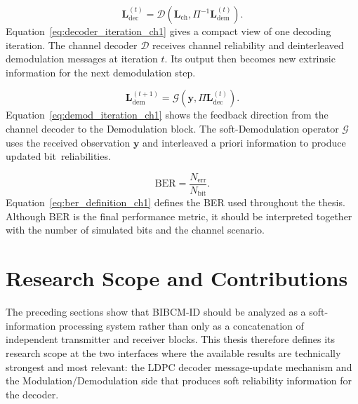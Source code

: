 \begin{equation}
\label{eq:decoder_iteration_ch1}
\mathbf{L}^{(t)}_{\mathrm{dec}}=
\mathcal{D}\!\left(\mathbf{L}_{\mathrm{ch}},\Pi^{-1}\mathbf{L}^{(t)}_{\mathrm{dem}}\right).
\end{equation}
Equation~\eqref{eq:decoder_iteration_ch1} gives a compact view of one decoding iteration. The channel decoder $\mathcal{D}$ receives channel reliability and deinterleaved demodulation messages at iteration $t$. Its output then becomes new extrinsic information for the next demodulation step.

\begin{equation}
\label{eq:demod_iteration_ch1}
\mathbf{L}^{(t+1)}_{\mathrm{dem}}=
\mathcal{G}\!\left(\mathbf{y},\Pi\mathbf{L}^{(t)}_{\mathrm{dec}}\right).
\end{equation}
Equation~\eqref{eq:demod_iteration_ch1} shows the feedback direction from the channel decoder to the Demodulation block. The soft-Demodulation operator $\mathcal{G}$ uses the received observation $\mathbf{y}$ and interleaved a priori information to produce updated bit~reliabilities.

\begin{equation}
\label{eq:ber_definition_ch1}
\mathrm{BER}=\frac{N_{\mathrm{err}}}{N_{\mathrm{bit}}}.
\end{equation}
Equation~\eqref{eq:ber_definition_ch1} defines the BER used throughout the thesis. Although BER is the final performance metric, it should be interpreted together with the number of simulated bits and the channel scenario.

\section{Research Scope and Contributions}
The preceding sections show that BIBCM-ID should be analyzed as a soft-information processing system rather than only as a concatenation of independent transmitter and receiver blocks. This thesis therefore defines its research scope at the two interfaces where the available results are technically strongest and most relevant: the LDPC decoder message-update mechanism and the Modulation/Demodulation side that produces soft reliability information for the decoder.


